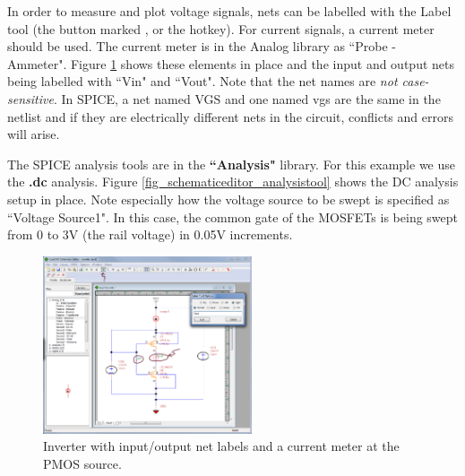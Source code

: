  In order to measure and plot voltage signals, nets can be labelled with the Label tool (the button marked , or the  hotkey).   For current signals, a current meter should be used.  The current meter is in the Analog library as ``Probe - Ammeter".  Figure \ref{fig_schematiceditor_sensetools} shows these elements in place and the input and output nets being labelled with \textsf{``Vin"} and \textsf{``Vout"}.  Note that the net names are \textit{not case-sensitive}. In SPICE, a net named \textsf{VGS} and one named \textsf{vgs} are the same in the netlist and if they are electrically different nets in the circuit, conflicts and errors will arise.  

 The SPICE analysis tools are in the \textbf{``Analysis"} library.  For this example we use the \textsf{\textbf{.dc}} analysis.    Figure \ref{fig_schematiceditor_analysistool} shows the DC analysis setup in place.  Note especially how the voltage source to be swept is specified as ``Voltage Source1".  In this case, the common gate of the MOSFETs is being swept from 0 to 3V (the rail voltage) in 0.05V increments.


\begin{figure}
    \includegraphics[width=0.55\textwidth]{./figures/getting_started_figures/SchematicEditor_labeling_and_Isense.png}
    \caption{Inverter with input/output net labels and a current meter at the PMOS source.}
  \label{fig_schematiceditor_sensetools}
\end{figure} 


